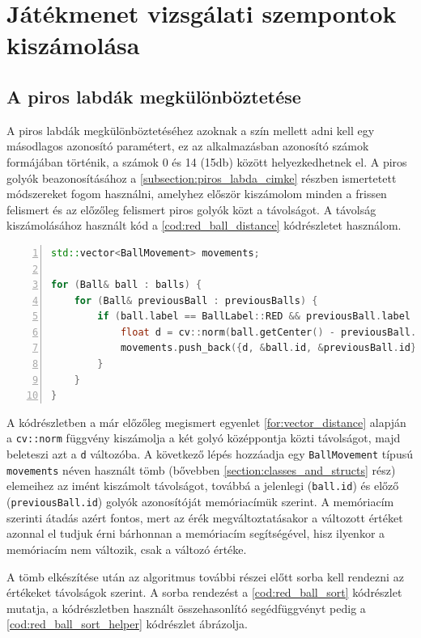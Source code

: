 \section{Játékmenet vizsgálati szempontok kiszámolása}
\subsection{A piros labdák megkülönböztetése}
A piros labdák megkülönböztetéséhez azoknak a szín mellett adni kell egy másodlagos azonosító paramétert, ez az alkalmazásban azonosító számok formájában történik, a számok 0 és 14 (15db) között helyezkedhetnek el. A piros golyók beazonosításához a \ref{subsection:piros_labda_cimke} részben ismertetett módszereket fogom használni, amelyhez először kiszámolom minden a frissen felismert és az előzőleg felismert piros golyók közt a távolságot. A távolság kiszámolásához használt kód a \ref{cod:red_ball_distance} kódrészletet használom.

\vspace{2mm}
\hspace{-10mm}
\begin{minipage}{\linewidth}
\begin{lstlisting}[language=C++, numbers=left, caption={Piros golyók közti távolság kiszámolása.}, label={cod:red_ball_distance}]
std::vector<BallMovement> movements;

for (Ball& ball : balls) {
    for (Ball& previousBall : previousBalls) {
        if (ball.label == BallLabel::RED && previousBall.label == BallLabel::RED) {
            float d = cv::norm(ball.getCenter() - previousBall.getCenter());
            movements.push_back({d, &ball.id, &previousBall.id});
        }
    }
}
\end{lstlisting}
\end{minipage}

\par A kódrészletben a már előzőleg megismert egyenlet \ref{for:vector_distance} alapján a \lstinline{cv::norm} függvény\cite{opencv_docs} kiszámolja a két golyó középpontja közti távolságot, majd beleteszi azt a \lstinline{d} változóba. A következő lépés hozzáadja egy \lstinline{BallMovement} típusú \lstinline{movements} néven használt tömb (bővebben \ref{section:classes_and_structs} rész) elemeihez az imént kiszámolt távolságot, továbbá a jelenlegi (\lstinline{ball.id}) és előző (\lstinline{previousBall.id}) golyók azonosítóját memóriacímük szerint. A memóriacím szerinti átadás azért fontos, mert az érék megváltoztatásakor a változott értéket azonnal el tudjuk érni bárhonnan a memóriacím segítségével, hisz ilyenkor a memóriacím nem változik, csak a változó értéke.
\par A tömb elkészítése után az algoritmus további részei előtt sorba kell rendezni az értékeket távolságok szerint. A sorba rendezést a \ref{cod:red_ball_sort} kódrészlet mutatja, a kódrészletben használt összehasonlító segédfüggvényt pedig a \ref{cod:red_ball_sort_helper} kódrészlet ábrázolja.

